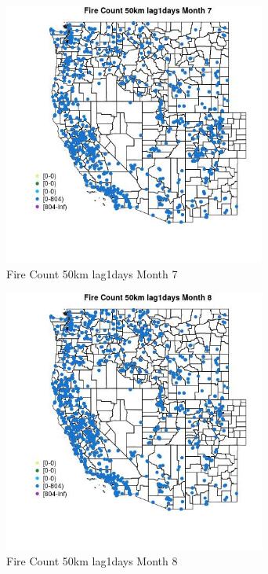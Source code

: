 \begin{figure} 
\centering  
\includegraphics[width=0.77\textwidth]{Code_Outputs/Report_ML_input_PM25_Step4_part_f_de_duplicated_aves_prioritize_24hr_obswNAs_MapObsMo7Fire_Count_50km_lag1days.jpg} 
\caption{\label{fig:Report_ML_input_PM25_Step4_part_f_de_duplicated_aves_prioritize_24hr_obswNAsMapObsMo7Fire_Count_50km_lag1days}Fire Count 50km lag1days Month 7} 
\end{figure} 
 

\clearpage 

\begin{figure} 
\centering  
\includegraphics[width=0.77\textwidth]{Code_Outputs/Report_ML_input_PM25_Step4_part_f_de_duplicated_aves_prioritize_24hr_obswNAs_MapObsMo8Fire_Count_50km_lag1days.jpg} 
\caption{\label{fig:Report_ML_input_PM25_Step4_part_f_de_duplicated_aves_prioritize_24hr_obswNAsMapObsMo8Fire_Count_50km_lag1days}Fire Count 50km lag1days Month 8} 
\end{figure} 
 


